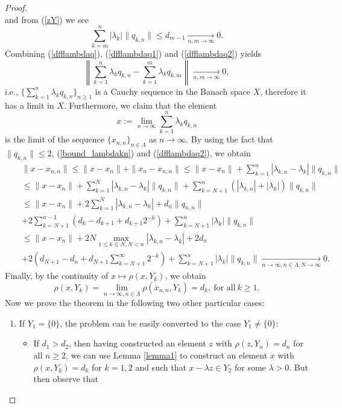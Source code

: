 \documentclass[12pt, reqno]{amsart}
\theoremstyle{definition}
\theoremstyle{remark}
\numberwithin{equation}{section}
\begin{document}
\begin{proof}
\begin{equation}
\end{equation}
and  from (\ref{zY}) we see
\begin{equation}
\label{dfflambdaq2}
\sum_{k=m}^n|\lambda_k|\|q_{k,n}\|\le d_{m-1}\xrightarrow[n,m\rightarrow\infty]{}0.
\end{equation}
Combining (\ref{dfflambdaq}), (\ref{dfflambdaq1}) and (\ref{dfflambdaq2}) yields
$$
\left\|\sum_{k=1}^n\lambda_{k}q_{k,n}-\sum_{k=1}^m\lambda_{k}q_{k,m}\right\|\xrightarrow[n,m\rightarrow\infty]{}0,
$$
i.e., $\Big\{\sum\limits_{k=1}^n\lambda_kq_{k,n}\Big\}_{n\ge1}$ is a Cauchy sequence in the Banach space $X$, therefore it has a limit in $X$.
Furthermore, we claim that the element
$$
x:=\lim_{n\rightarrow\infty}\sum_{k=1}^n\lambda_kq_{k,n}
$$
is the limit of the sequence $\{x_{n,n}\}_{n\in\Lambda}$ as $n\to\infty$. By using the fact that
$\|q_{k,n}\|\le 2$, (\ref{bound_lambdakn}) and (\ref{dfflambdaq2}), we obtain
\begin{eqnarray*}
&&\|x-x_{n,n}\|\le \|x-x_n\|+\|x_n-x_{n,n}\|\le \|x-x_n\|+\sum_{k=1}^n|\lambda_{k,n}-\lambda_k|\|q_{k,n}\|\\
&&\le \|x-x_n\|+\sum_{k=1}^{N}|\lambda_{k,n}-\lambda_k|\|q_{k,n}\|+\sum_{k=N+1}^n(|\lambda_{k,n}|+|\lambda_k|)\|q_{k,n}\|\\
&&\le \|x-x_n\|+2\sum_{k=1}^{N}|\lambda_{k,n}-\lambda_k|+d_{n}\|q_{n,n}\|\\
&&+2\sum_{k=N+1}^{n-1}\left(d_k-d_{k+1}+d_{k+1}2^{-k}\right)+\sum_{k=N+1}^n|\lambda_k|\|q_{k,n}\|\\
&&\le \|x-x_n\|+2 N\max_{1\le k\le N,N<n}|\lambda_{k,n}-\lambda_k|+2d_n\\
&&+2\left(d_{N+1}-d_n+d_{N+1}\sum_{k=N+1}^{\infty}2^{-k}\right)+\sum_{k=N+1}^n|\lambda_k|\|q_{k,n}\|\xrightarrow[n\rightarrow\infty,n\in\Lambda,N\rightarrow\infty]{}0.
\end{eqnarray*}
Finally, by the continuity of $x\longmapsto\rho(x,Y_k)$, we obtain
$$
\rho(x,Y_k)=\lim_{n\rightarrow\infty,n\in\Lambda}\rho(x_{n,n},Y_k)=d_k,~\mbox{for all}~k\ge1.
$$
Now we prove the theorem in the following two other particular cases:
\begin{enumerate}
\item If $Y_1=\{0\}$, the problem can be easily converted to the case $Y_1\neq\{0\}$:
\begin{itemize}
\item If $d_1>d_2$, then having constructed an element $z$ with $\rho(z,Y_n)=d_n$ for all $n\ge 2$, we can use Lemma \ref{lemma1} to construct an element $x$ with $\rho(x,Y_k)=d_k$ for $k=1,2$ and such that $x-\lambda z\in Y_{2}$ for some $\lambda>0$. But then observe that

\end{itemize}
\end{enumerate}
\end{proof}
\end{document}
